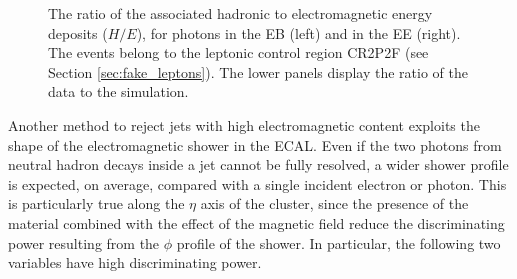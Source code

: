 \begin{figure}
  \centering
  \hfill
  \hfill
  \hfill\mbox{}
\caption{The ratio of the associated hadronic to electromagnetic energy deposits ($H/E$), for photons in the EB (left) and in the EE (right).
The events belong to the leptonic control region CR2P2F (see Section \ref{sec:fake_leptons}).
The lower panels display the ratio of the data to the simulation.}
\label{fig:HoverE_CR2P2F}
\end{figure}

Another method to reject jets with high electromagnetic content exploits the shape of the electromagnetic shower in the ECAL.
Even if the two photons from neutral hadron decays inside a jet cannot be fully resolved, a wider shower profile is expected, on average,
compared with a single incident electron or photon.
This is particularly true along the $\eta$ axis of the cluster, since the presence of the material combined with the effect of the magnetic field
reduce the discriminating power resulting from the $\phi$ profile of the shower. 
In particular, the following two variables have high discriminating power.

